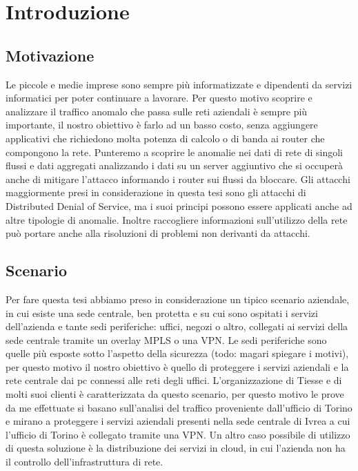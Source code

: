 \chapter{Introduzione}

\section{Motivazione}

Le piccole e medie imprese sono sempre più informatizzate e dipendenti da servizi informatici per poter continuare a lavorare. Per questo motivo scoprire e analizzare il traffico anomalo che passa sulle reti aziendali è sempre più importante, il nostro obiettivo è farlo ad un basso costo, senza aggiungere applicativi che richiedono molta potenza di calcolo o di banda ai router che compongono la rete. Punteremo a scoprire le anomalie nei dati di rete di singoli flussi e dati aggregati analizzando i dati su un server aggiuntivo che si occuperà anche di mitigare l'attacco informando i router sui flussi da bloccare.
Gli attacchi maggiormente presi in considerazione in questa tesi sono gli attacchi di Distributed Denial of Service, ma i suoi principi possono essere applicati anche ad altre tipologie di anomalie.
Inoltre raccogliere informazioni sull'utilizzo della rete può portare anche alla risoluzioni di problemi non derivanti da attacchi.

\section{Scenario}
Per fare questa tesi abbiamo preso in considerazione un tipico scenario aziendale, in cui esiste una sede centrale, ben protetta e su cui sono ospitati i servizi dell'azienda e tante sedi periferiche: uffici, negozi o altro, collegati ai servizi della sede centrale tramite un overlay MPLS o una VPN.
Le sedi periferiche sono quelle più esposte sotto l'aspetto della sicurezza (todo: magari spiegare i motivi), per questo motivo il nostro obiettivo è quello di proteggere i servizi aziendali e la rete centrale dai pc connessi alle reti degli uffici.
L'organizzazione di Tiesse e di molti suoi clienti è caratterizzata da questo scenario, per questo motivo le prove da me effettuate si basano sull'analisi del traffico proveniente dall'ufficio di Torino e mirano a proteggere i servizi aziendali presenti nella sede centrale di Ivrea a cui l'ufficio di Torino è collegato tramite una VPN.
Un altro caso possibile di utilizzo di questa soluzione è la distribuzione dei servizi in cloud, in cui l'azienda non ha il controllo dell'infrastruttura di rete.

